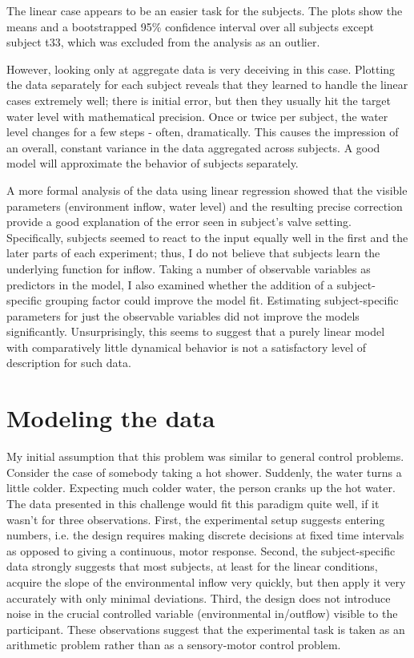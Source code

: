 \documentclass[twocolumn]{article}
\begin{document}
The linear case appears to be an easier task for the subjects.  The plots show the means and a bootstrapped 95\% confidence interval over all subjects except subject t33, which was excluded from the analysis as an outlier.

However, looking only at aggregate data is very deceiving in this case.  Plotting the data separately for each subject reveals that they learned to handle the linear cases extremely well; there is initial error, but then they usually hit the target water level with mathematical precision.  Once or twice per subject, the water level changes for a few steps - often, dramatically.  This causes the impression of an overall, constant variance in the data aggregated across subjects. A good model will approximate the behavior of subjects separately.

A more formal analysis of the data using linear regression showed that the visible parameters (environment inflow, water level) and the resulting precise correction provide a good explanation of the error seen in subject's valve setting.  Specifically, subjects seemed to react to the input equally well in the first and the later parts of each experiment; thus, I do not believe that subjects learn the underlying function  for inflow.  Taking a number of observable variables as predictors in the model, I also examined whether the addition of a subject-specific grouping factor could improve the model fit.  Estimating subject-specific parameters for just the observable variables did not improve the models significantly.  Unsurprisingly, this seems to suggest that a purely linear model with comparatively little dynamical behavior is not a satisfactory level of description for such data.


\section{Modeling the data}
\label{sec:modeling-data}

My initial assumption that this problem was similar to general control problems.  Consider the case of somebody taking a hot shower. Suddenly, the water turns a little colder.  Expecting much colder water, the person cranks up the hot water.  The data presented in this challenge would fit this paradigm quite well, if it wasn't for three observations.  First, the experimental setup suggests entering numbers, i.e. the design requires making discrete decisions at fixed time intervals as opposed to giving a continuous, motor response.  Second, the subject-specific data strongly suggests that most subjects, at least for the linear conditions, acquire the slope of the environmental inflow very quickly, but then apply it very accurately with only minimal deviations.  Third, the design does not introduce noise in the crucial controlled variable (environmental in/outflow) visible to the participant.
These observations suggest that the experimental task is taken as an arithmetic problem rather than as a sensory-motor control problem.
\end{document}
